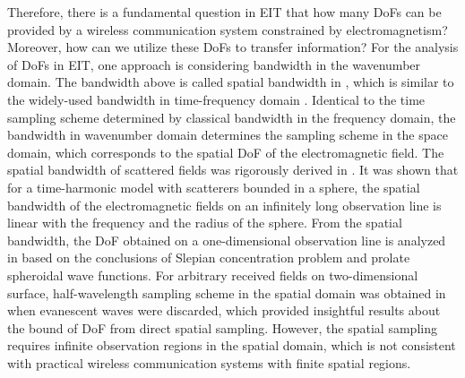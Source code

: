 \documentclass[12pt,draftclsnofoot,journal,onecolumn]{IEEEtran}
\begin{document}
Therefore, there is a fundamental question in EIT that how many DoFs can be provided by a wireless communication system constrained by electromagnetism? Moreover, how can we utilize these DoFs to transfer information? For the analysis of DoFs in EIT, one approach is considering bandwidth in the wavenumber domain.  The bandwidth above is called spatial bandwidth in \cite{bucci1987spatial}, which is similar to the widely-used bandwidth in time-frequency domain \cite{slepian1976bandwidth}. Identical to the time sampling scheme determined by classical bandwidth in the frequency domain, the bandwidth in wavenumber domain determines the sampling scheme in the space domain, which corresponds to the spatial DoF of the electromagnetic field. The spatial bandwidth of scattered fields was rigorously derived in \cite{bucci1987spatial}. It was shown that for a time-harmonic model with scatterers bounded in a sphere, the spatial bandwidth of the electromagnetic fields on an infinitely long observation line is linear with the frequency and the radius of the sphere. From the spatial bandwidth, the DoF obtained on a one-dimensional observation line is analyzed in \cite{bucci1989degrees} based on the conclusions of Slepian concentration problem and prolate spheroidal wave functions. For arbitrary received fields on two-dimensional surface, half-wavelength sampling scheme in the spatial domain was obtained in \cite{balanis2015antenna} when evanescent waves were discarded, which provided insightful results about the bound of DoF from direct spatial sampling. However, the spatial sampling requires infinite observation regions in the spatial domain, which is not consistent with practical wireless communication systems with finite spatial regions. 
\end{document}
